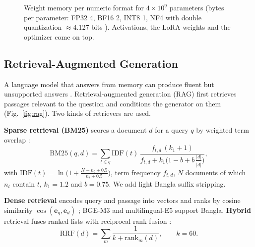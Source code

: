 \begin{figure}[!t]
\centering
{}
\caption{Weight memory per numeric format for $4\times10^9$ parameters (bytes per parameter: FP32 4, BF16 2, INT8 1, NF4 with double quantization $\approx$4.127 bits \cite{dettmers2023qlora}). Activations, the LoRA weights and the optimizer come on top.}
\label{fig:mem}
\end{figure}

\subsection{Retrieval-Augmented Generation}
A language model that answers from memory can produce fluent but unsupported answers \cite{ji2023survey}. Retrieval-augmented generation (RAG) first retrieves passages relevant to the question and conditions the generator on them \cite{lewis2020rag} (Fig.~\ref{fig:rag}). Two kinds of retrievers are used.

\textbf{Sparse retrieval (BM25)} scores a document $d$ for a query $q$ by weighted term overlap \cite{robertson2009bm25}:
\begin{equation}
\mathrm{BM25}(q,d)=\sum_{t\in q}\mathrm{IDF}(t)\,\frac{f_{t,d}\,(k_1+1)}{f_{t,d}+k_1\big(1-b+b\,\frac{|d|}{\overline{|d|}}\big)},
\end{equation}
with $\mathrm{IDF}(t)=\ln\!\big(1+\frac{N-n_t+0.5}{n_t+0.5}\big)$, term frequency $f_{t,d}$, $N$ documents of which $n_t$ contain $t$, $k_1=1.2$ and $b=0.75$. We add light Bangla suffix stripping.

\textbf{Dense retrieval} encodes query and passage into vectors and ranks by cosine similarity $\cos(\mathbf{e}_q,\mathbf{e}_d)$ \cite{karpukhin2020dpr}; BGE-M3 \cite{chen2024bgem3} and multilingual-E5 \cite{wang2024me5} support Bangla. \textbf{Hybrid} retrieval fuses ranked lists with reciprocal rank fusion \cite{cormack2009rrf}:
\begin{equation}
\mathrm{RRF}(d)=\sum_{m}\frac{1}{k+\mathrm{rank}_m(d)},\qquad k=60.
\label{eq:rrf}
\end{equation}


